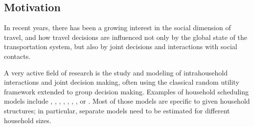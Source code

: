 {\subsection{Motivation}

In recent years, there has been a growing interest in the social dimension of travel,
and how travel decisions are influenced not only by the global state of the transportation system,
but also by joint decisions and interactions with social contacts.

A very active field of research is the study and modeling of intrahousehold interactions
and joint decision making, %
often using the classical random utility framework extended to group decision making.
%
Examples of household scheduling models include
,
%
,
%
,
%
,
%
,
%
,
%
,
%
or
.
%
Most of those models
are specific to given household structures;
in particular, separate models need to be estimated for different household sizes.


}
